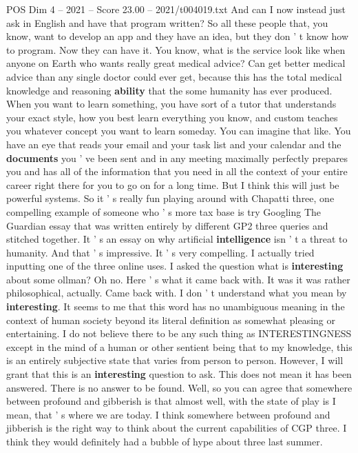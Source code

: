 \begin{textsample}{POS Dim 4 – 2021 – Score 23.00 – 2021/t004019.txt}
And can I now instead just ask in English and have that program written?
So all these people that, you know, want to develop an app and they have an idea, but they don ' t know how to program.
Now they can have it.
You know, what is the service look like when anyone on Earth who wants really great medical advice?
Can get better medical advice than any single doctor could ever get, because this has the total medical knowledge and reasoning \textbf{ability} that the some humanity has ever produced.
When you want to learn something, you have sort of a tutor that understands your exact style, how you best learn everything you know, and custom teaches you whatever concept you want to learn someday.
You can imagine that like.
You have an eye that reads your email and your task list and your calendar and the \textbf{documents} you ' ve been sent and in any meeting maximally perfectly prepares you and has all of the information that you need in all the context of your entire career right there for you to go on for a long time.
But I think this will just be powerful systems.
So it ' s really fun playing around with Chapatti three, one compelling example of someone who ' s more tax base is try Googling The Guardian essay that was written entirely by different GP2 three queries and stitched together.
It ' s an essay on why artificial \textbf{intelligence} isn ' t a threat to humanity.
And that ' s impressive.
It ' s very compelling.
I actually tried inputting one of the three online uses.
I asked the question what is \textbf{interesting} about some ollman?
Oh no.
Here ' s what it came back with.
It was it was rather philosophical, actually.
Came back with.
I don ' t understand what you mean by \textbf{interesting}.
It seems to me that this word has no unambiguous meaning in the context of human society beyond its literal definition as somewhat pleasing or entertaining.
I do not believe there to be any such thing as INTERESTINGNESS except in the mind of a human or other sentient being that to my knowledge, this is an entirely subjective state that varies from person to person.
However, I will grant that this is an \textbf{interesting} question to ask.
This does not mean it has been answered.
There is no answer to be found.
Well, so you can agree that somewhere between profound and gibberish is that almost well, with the state of play is I mean, that ' s where we are today.
I think somewhere between profound and jibberish is the right way to think about the current capabilities of CGP three.
I think they would definitely had a bubble of hype about three last summer.

\end{textsample}
